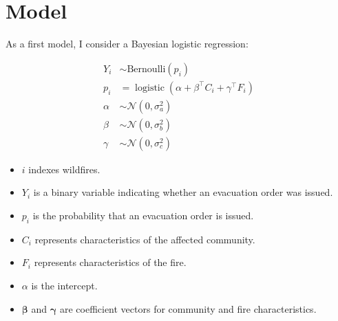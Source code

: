 \documentclass[11pt]{article}
\begin{document}
\begin{table}[h]
\centering
{}
\caption{Example rows from the Canadian National Fire Database (CNFDB) fire point dataset.}
\end{table}

\newpage
\section{Model}

As a first model, I consider a Bayesian logistic regression:

\begin{align}
Y_i &\sim \mathrm{Bernoulli}(p_i) \\
p_i &= \operatorname{logistic}\!\left(\alpha + \beta^\top C_i + \gamma^\top F_i \right) \\
\alpha &\sim \mathcal{N}(0,\sigma_a^2) \\
\beta &\sim \mathcal{N}(0,\sigma_b^2) \\
\gamma &\sim \mathcal{N}(0,\sigma_c^2)
\end{align}
\begin{itemize}
\item $i$ indexes wildfires.
\item $Y_i$ is a binary variable indicating whether an evacuation order was issued.
\item $p_i$ is the probability that an evacuation order is issued.
\item $C_i$ represents characteristics of the affected community.
\item $F_i$ represents characteristics of the fire.
\item $\alpha$ is the intercept.
\item $\boldsymbol{\beta}$ and $\boldsymbol{\gamma}$ are coefficient vectors for community and fire characteristics.
\end{itemize}
\end{document}
